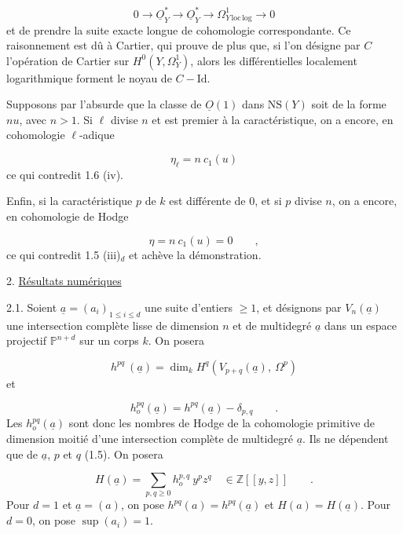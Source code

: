 \begin{equation*}
0 \longrightarrow \underline{O}^*_Y \longrightarrow \underline{O}^*_Y \longrightarrow \Omega^1_{Y\,\mathrm{loc}\,\mathrm{log}} \longrightarrow 0
\end{equation*}
et de prendre la suite exacte longue de cohomologie correspondante. Ce raisonnement est dû à Cartier, qui prouve de plus que, si l'on désigne par $C$ l'opération de Cartier sur $H^0(Y,\Omega^1_Y)$, alors les différentielles localement logarithmique forment le noyau de $C - \mathrm{Id}$.

Supposons par l'absurde que la classe de $\underline{O}(1)$ dans $\mathrm{NS}(Y)$ soit de la forme $nu$, avec $n > 1$. Si $\ell$ divise $n$ et est premier à la caractéristique,
on a encore, en cohomologie $\ell$-adique

\begin{equation*}
\eta_\ell = n\ c_1(u)
\end{equation*}
ce qui contredit 1.6 (iv).

Enfin, si la caractéristique $p$ de $k$ est différente de $0$, et si $p$ divise $n$, on a encore, en cohomologie de Hodge

\begin{equation*}
\eta = n\ c_1(u) = 0 \qquad ,
\end{equation*}
ce qui contredit 1.5 (iii)$_d$ et achève la démonstration.


2. \underline{Résultats numériques}

2.1. Soient $\underline{a}=(a_i)_{1\leq i\leq d}$ une suite d'entiers $\geq 1$, et désignons par $V_n(\underline{a})$ une intersection complète lisse de dimension $n$ et de multidegré $\underline{a}$ dans un espace projectif $\mathbb{P}^{n+d}$ sur un corps $k$. On posera

\begin{equation*}
h^{pq}\ (\underline{a}) = \dim_k H^q(V_{p+q}(\underline{a}),\ \Omega^p)
\end{equation*}
et

\begin{equation*}
h_o^{pq}(\underline{a}) = h^{pq}(\underline{a}) - \delta_{p,q} \qquad .
\end{equation*}
Les $h_o^{pq}(\underline{a})$ sont donc les nombres de Hodge de la cohomologie primitive de dimension moitié d'une intersection complète de multidegré $\underline{a}$. Ils ne dépendent que de $\underline{a}$, $p$ et $q$ (1.5). On posera

\begin{equation}\tag{2.1.1}
H(\underline{a}) = \sum_{p,q\geq 0} h_o^{p,q}\ y^p z^q \quad \in \mathbb{Z}[[y,z]] \qquad .
\end{equation}
Pour $d = 1$ et $\underline{a} = (a)$, on pose $h^{pq}(a) = h^{pq}(\underline{a})$ et $H(a) = H(\underline{a})$. Pour $d = 0$, on pose $\sup(a_i) = 1$.

